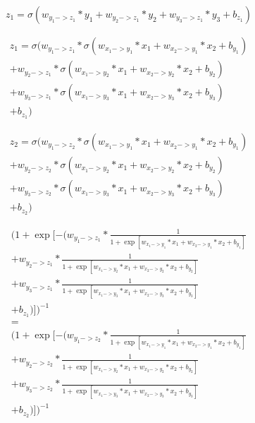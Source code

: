 \documentclass{article}
\begin{document}
\begin{equation}
    z_1 = \sigma(
        w_{y_1->z_1}*y_1 + 
        w_{y_2->z_1}*y_2 + 
        w_{y_3->z_1}*y_3 + b_{z_1})   
\end{equation}


\begin{multline}
        z_1 = \sigma(
            w_{y_1->z_1}*\sigma(
                    w_{x_1->y_1} * x_1 + 
                    w_{x_2->y_1} * x_2 + b_{y_1})\\
            + w_{y_2->z_1}*\sigma(
                    w_{x_1->y_2} * x_1 + 
                    w_{x_2->y_2} * x_2 + b_{y_2})\\ 
            + w_{y_3->z_1}*\sigma(
                    w_{x_1->y_3} * x_1 + 
                    w_{x_2->y_3} * x_2 + b_{y_3})\\
            + b_{z_1})
\end{multline}

\begin{multline}
    z_2 = \sigma(
        w_{y_1->z_2}*\sigma(
                w_{x_1->y_1} * x_1 + 
                w_{x_2->y_1} * x_2 + b_{y_1}) \\
        + w_{y_2->z_2}*\sigma(
                w_{x_1->y_2} * x_1 + 
                w_{x_2->y_2} * x_2 + b_{y_2})\\ 
        + w_{y_3->z_2}*\sigma(
                w_{x_1->y_3} * x_1 + 
                w_{x_2->y_3} * x_2 + b_{y_3})\\
        + b_{z_2})
\end{multline}

\begin{multline}
    (1+\exp[- (w_{y_1->z_1}* \frac{1}{1+\exp[
            w_{x_1->y_1} * x_1 + 
            w_{x_2->y_1} * x_2 + b_{y_1}]}\\
        + w_{y_2->z_1}* \frac{1}{1+\exp[
            w_{x_1->y_2} * x_1 + 
            w_{x_2->y_2} * x_2 + b_{y_2}]}\\
        + w_{y_3->z_1}* \frac{1}{1+\exp[
            w_{x_1->y_3} * x_1 + 
            w_{x_2->y_3} * x_2 + b_{y_3}]}\\
    + b_{z_1})])^{-1}
    \\=\\
    (1+\exp[- (w_{y_1->z_2}* \frac{1}{1+\exp[   
            w_{x_1->y_1} * x_1 + 
            w_{x_2->y_1} * x_2 + b_{y_1}]}\\
        + w_{y_2->z_2}*\frac{1}{1+\exp[
            w_{x_1->y_2} * x_1 + 
            w_{x_2->y_2} * x_2 + b_{y_2}]}\\
        + w_{y_3->z_2}*\frac{1}{1+\exp[
            w_{x_1->y_3} * x_1 + 
            w_{x_2->y_3} * x_2 + b_{y_3}]}\\
    + b_{z_2})])^{-1}\\
\end{multline}
\end{document}
